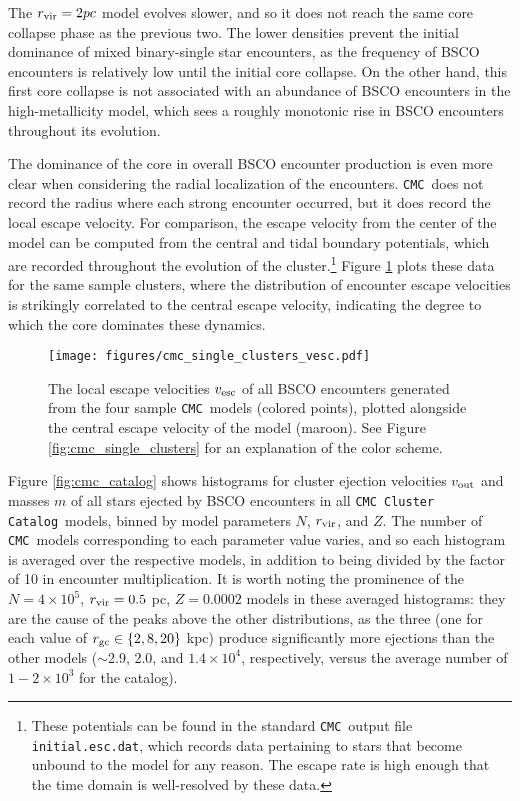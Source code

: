 \documentclass[twocolumn]{aastex631}
\newcommand{\CMC}{\texttt{CMC}}
\newcommand{\CMCcat}{\texttt{CMC Cluster Catalog}}
\begin{document}
The $r_{\rm vir} = 2 pc$ model evolves slower, and so it does not reach the same core collapse phase as the previous two.
The lower densities prevent the initial dominance of mixed binary-single star encounters, as the frequency of BSCO encounters is relatively low until the initial core collapse.
On the other hand, this first core collapse is not associated with an abundance of BSCO encounters in the high-metallicity model, which sees a roughly monotonic rise in BSCO encounters throughout its evolution.

The dominance of the core in overall BSCO encounter production is even more clear when considering the radial localization of the encounters.
\CMC\ does not record the radius where each strong encounter occurred, but it does record the local escape velocity.
For comparison, the escape velocity from the center of the model can be computed from the central and tidal boundary potentials, which are recorded throughout the evolution of the cluster.\footnote{These potentials can be found in the standard \CMC\ output file \texttt{initial.esc.dat}, which records data pertaining to stars that become unbound to the model for any reason.  The escape rate is high enough that the time domain is well-resolved by these data.}
Figure \ref{fig:cmc_single_clusters_vesc} plots these data for the same sample clusters, where the distribution of encounter escape velocities is strikingly correlated to the central escape velocity, indicating the degree to which the core dominates these dynamics.

\begin{figure}
    \centering
    \texttt{[image: figures/cmc\_single\_clusters\_vesc.pdf]}
    \caption{
        The local escape velocities $v_{\rm esc}$ of all BSCO encounters generated from the four sample \CMC\ models (colored points), plotted alongside the central escape velocity of the model (maroon).
        See Figure \ref{fig:cmc_single_clusters} for an explanation of the color scheme.
    }
    \label{fig:cmc_single_clusters_vesc}
\end{figure}

Figure \ref{fig:cmc_catalog} shows histograms for cluster ejection velocities $v_{\rm out}$ and masses $m$ of all stars ejected by BSCO encounters in all \CMCcat\ models, binned by model parameters $N$, $r_{\rm vir}$, and $Z$.
The number of \CMC\ models corresponding to each parameter value varies, and so each histogram is averaged over the respective models, in addition to being divided by the factor of 10 in encounter multiplication.
It is worth noting the prominence of the $N = 4\times10^5$, $r_{\rm vir} = 0.5$ pc, $Z = 0.0002$ models in these averaged histograms: they are the cause of the peaks above the other distributions, as the three (one for each value of $r_{\rm gc} \in \{2, 8, 20\}$ kpc) produce significantly more ejections than the other models ($\sim$2.9, 2.0, and $1.4 \times 10^4$, respectively, versus the average number of $1-2 \times 10^3$ for the catalog).
\end{document}
